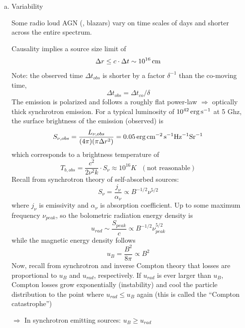 \begin{enumerate}[a)]
   \item Variability
   
   Some radio loud AGN (\eg, blazars) vary on time scales of days and shorter across the entire spectrum. 

   Causality implies a source size limit of 
\begin{equation}
   \Delta r \le c\cdot \Delta t \sim 10^{16} \rm\,cm
\end{equation}
Note: the observed time $\Delta t_{obs}$ is shorter by a factor $\delta^{-1}$ than the co-moving time,
\begin{equation}
   \Delta t_{obs} = \Delta t_{co} / \delta
\end{equation}
The emission is polarized and follows a roughly flat power-law $\Rightarrow$ optically thick synchrotron emission.
For a typical luminosity of $10^{42} \,{\rm erg\,s^{-1}}$ at 5 Ghz, the surface brightness of the emission (observed) is
\begin{equation}
   S_{\nu,obs} = \frac{L_{\nu,obs}}{(4\pi)(\pi \Delta r^{2})} = 0.05 \,\rm erg\,cm^{-2}\,s^{-1}Hz^{-1}Sr^{-1}
\end{equation}
which corresponds to a brightness temperature of 
\begin{equation}
   T_{b,obs} = \frac{c^{2}}{2\nu^{2}k} \cdot S_{\nu} \approx 10^{16} K ~~~(\textrm{not reasonable})
\end{equation} 
Recall from synchrotron theory of self-absorbed sources:
\begin{equation}
   S_{\nu} = \frac{j_{\nu}}{\alpha_{\nu}} \propto B^{-1/2} \nu^{5/2}
\end{equation}
where $j_{\nu}$ is emissivity and $\alpha_{\nu}$ is absorption coefficient. Up to some maximum frequency
$\nu_{peak}$, so the bolometric radiation energy density is
\begin{equation}
   u_{rad} \sim \frac{S_{peak}}{c} \propto B^{-1/2} \nu_{peak}^{5/2}
\end{equation}
while the magnetic energy density follows 
\begin{equation}
   u_{B} = \frac{B^2}{8\pi} \propto B^{2}
\end{equation}
Now, recall from synchrotron and inverse Compton theory that losses are proportional to $u_{B}$ and $u_{rad}$,
respectively. If $u_{rad}$ is ever larger than $u_{B}$, Compton losses grow exponentially (instability) and cool
the particle distribution to the point where $u_{rad} \le u_{B}$ again (this is called the ``Compton catastrophe'')

$\Rightarrow$ In synchrotron emitting sources: $u_{B} \ge u_{rad}$


\end{enumerate}
